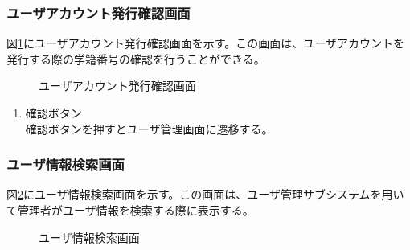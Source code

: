 \documentclass[a4j]{jarticle}
\begin{document}
\subsubsection{ユーザアカウント発行確認画面}
図\ref{fig:new_user}にユーザアカウント発行確認画面を示す。この画面は、ユーザアカウントを発行する際の学籍番号の確認を行うことができる。
\begin{figure}[H]
\centering
{}
\caption{ユーザアカウント発行確認画面}
\label{fig:new_user}
\end{figure}

\begin{enumerate}
  \renewcommand{\labelenumi}{\textcircled{\scriptsize \theenumi}}

\item 確認ボタン\\
確認ボタンを押すとユーザ管理画面に遷移する。

\end{enumerate}

\subsubsection{ユーザ情報検索画面}
図\ref{fig:search_user}にユーザ情報検索画面を示す。この画面は、ユーザ管理サブシステムを用いて管理者がユーザ情報を検索する際に表示する。

\begin{figure}[H]
\centering
{}
\caption{ユーザ情報検索画面}
\label{fig:search_user}
\end{figure}
\end{document}
